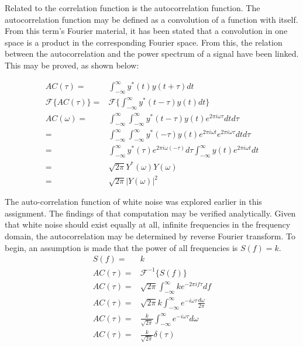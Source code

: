 \documentclass[twocolumn]{article}
\begin{document}
Related to the correlation function is the autocorrelation function. The autocorrelation function may be defined as a convolution of a function with itself. From this term's Fourier material, it has been stated that a convolution in one space is a product in the corresponding Fourier space. From this, the relation between the autocorrelation and the power spectrum of a signal have been linked. This may be proved, as shown below:

\begin{equation}
\begin{split}
AC(\tau) = & \int_{-\infty}^{\infty} y^*(t) y(t + \tau) dt\\
\mathcal{F} \{AC(\tau)\} = & \mathcal{F} \{\int_{-\infty}^{\infty} y^*(t - \tau) y(t) dt\} \\
AC(\omega) = & \int_{-\infty}^{\infty} \int_{-\infty}^{\infty} y^*(t - \tau) y(t) e^{2\pi i \omega \tau} dt d\tau \\
= & \int_{-\infty}^{\infty} \int_{-\infty}^{\infty} y^*(-\tau) y(t) e^{2\pi i \omega t} e^{2\pi i \omega \tau} dt d\tau \\
= & \int_{-\infty}^{\infty}y^*(\tau) e^{2\pi i \omega (-\tau)}  d\tau \int_{-\infty}^{\infty}  y(t)  e^{2\pi i \omega t} dt \\
= &\sqrt{2\pi} Y^*(\omega)Y(\omega) \\
= & \sqrt{2\pi} |Y(\omega)|^2
\end{split}
\end{equation}

The auto-correlation function of white noise was explored earlier in this assignment. The findings of that computation may be verified analytically. Given that white noise should exist equally at all, infinite frequencies in the frequency domain, the autocorrelation may be determined by reverse Fourier transform. To begin, an assumption is made that the power of all frequencies is $S(f) = k$.
\begin{equation}
\begin{split}
S(f) =& k \\
AC(\tau) =& \mathcal{F}^{-1} \{ S(f) \} \\
AC(\tau) =& \sqrt{2\pi} \int_{-\infty}^{\infty} k e^{-2\pi i f \tau} df \\
AC(\tau) =& \sqrt{2\pi}k \int_{-\infty}^{\infty} e^{- i \omega \tau} \frac{d\omega}{2\pi} \\
AC(\tau) =& \frac{k}{\sqrt{2\pi}} \int_{-\infty}^{\infty} e^{- i \omega \tau} d\omega \\
AC(\tau) =& \frac{k}{\sqrt{2\pi}} \delta(\tau) \\
\end{split}
\end{equation}
\end{document}
